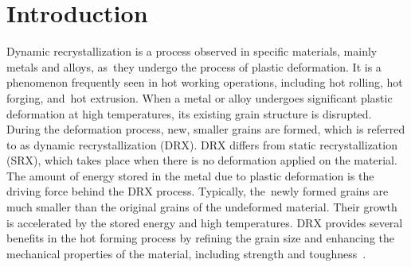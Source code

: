 \documentclass[metals,article,accept,pdftex,moreauthors]{Definitions/mdpi}
\begin{document}
\section{Introduction}\label{sec:Introduction}

Dynamic recrystallization is a process observed in specific materials, mainly metals and alloys, as~they undergo the process of plastic deformation.
It is a phenomenon frequently seen in hot working operations, including hot rolling, hot forging, and~hot extrusion.
\linebreak When a metal or alloy undergoes significant plastic deformation at high temperatures, its existing grain structure is disrupted.
During the deformation process, new, smaller grains are formed, which is referred to as dynamic recrystallization (DRX).
DRX differs from static recrystallization (SRX), which takes place when there is no deformation applied on the material.
The amount of energy stored in the metal due to plastic deformation is the driving force behind the DRX process.
Typically, the~newly formed grains are much smaller than the original grains of the undeformed material.
Their growth is accelerated by the stored energy and high temperatures.
DRX provides several benefits in the hot forming process by refining the grain size and enhancing the mechanical properties of the material, including strength and toughness~\cite{Javidikia-2023, Shen-2021}.
\end{document}

